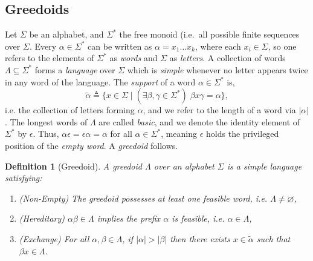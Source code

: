 \documentclass[11pt]{article}
\newtheorem{definition}[theorem]{Definition}
\newcommand{\univ}{\Sigma}
\newcommand{\glang}{\Lambda}
\begin{document}
\subsection{Greedoids}
Let $\univ$ be an alphabet, and $\univ^*$ the free monoid (i.e.\ all possible finite sequences over $\univ$. 
Every $\alpha \in \univ^*$ can be written as $\alpha = x_1\ldots x_k$, where each $x_i \in \univ$,
so one refers to the elements of
$\univ^*$ as \emph{words} and $\univ$ as \emph{letters}. A collection of words $\glang \subseteq
\univ^*$ forms a \emph{language} over $\univ$ which is \emph{simple}
whenever no letter appears
twice in any word of the language. 
The \emph{support} of
a word $\alpha\in\univ^*$ is,
$$\widetilde{\alpha}\triangleq\{x\in\univ\mid(\exists \beta,\gamma\in\univ^*)\;\beta x \gamma = \alpha\},$$
i.e. the collection of letters forming $\alpha$, and we refer to the length of a
word via $|\alpha|$.
The longest words of $\glang$ are called \emph{basic}, and 
we denote the identity element of
$\univ^*$ by $\epsilon$. Thus, 
$\alpha\epsilon = \epsilon\alpha = \alpha$ for all $\alpha \in \univ^*$, meaning $\epsilon$ holds the privileged position of the \emph{empty word}.
A \emph{greedoid} follows.
\begin{definition}[Greedoid]\label{def:greedoid}
    A \emph{greedoid} $\glang$ over an alphabet $\univ$ is a simple language satisfying:
    \begin{enumerate}
        \item \emph{(Non-Empty) }The greedoid possesses at least one feasible word, i.e. $\glang \neq \varnothing$,
        \item \emph{(Hereditary) }$\alpha\beta \in \Lambda$ implies the prefix $\alpha$ is feasible, i.e. $\alpha\in\Lambda$,
        \item \emph{(Exchange) }For all $\alpha, \beta \in \Lambda$, if $|\alpha| > |\beta|$ then there exists $x\in\widetilde{\alpha}$ such that $\beta x \in \Lambda$.
    \end{enumerate}
\end{definition}
\end{document}
